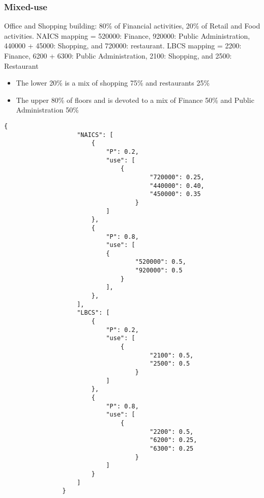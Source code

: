 {{        \subsubsection{Mixed-use}\label{mixed-use-building-finance-public-administration-shopping-restaurants}
        {
            Office and Shopping building: 80\% of Financial activities, 20\% of Retail and Food activities. NAICS mapping = 520000: Finance, 920000: Public Administration, 440000 + 45000: Shopping, and 720000: restaurant. LBCS mapping = 2200: Finance, 6200 + 6300: Public Administration, 2100: Shopping, and 2500: Restaurant

            \begin{itemize}
                \item The lower 20\% is a mix of shopping 75\% and restaurants 25\%
                \item The upper 80\% of floors and is devoted to a mix of Finance 50\% and Public Administration 50\% \end{itemize}

            \begin{Verbatim}[baselinestretch=0.75, tabsize=4, fontsize=\small]
                {
                    "NAICS": [
                        {
                            "P": 0.2,
                            "use": [
                                {
                                        "720000": 0.25,
                                        "440000": 0.40,
                                        "450000": 0.35
                                    }
                            ]
                        },
                        {
                            "P": 0.8,
                            "use": [
                            {
                                    "520000": 0.5,
                                    "920000": 0.5
                                }
                            ],
                        },
                    ],
                    "LBCS": [
                        {
                            "P": 0.2,
                            "use": [
                                {
                                        "2100": 0.5,
                                        "2500": 0.5
                                    }
                            ]
                        },
                        {
                            "P": 0.8,
                            "use": [
                                {
                                        "2200": 0.5,
                                        "6200": 0.25,
                                        "6300": 0.25
                                    }
                            ]
                        }
                    ]
                }
            \end{Verbatim}
        }
    }
}

